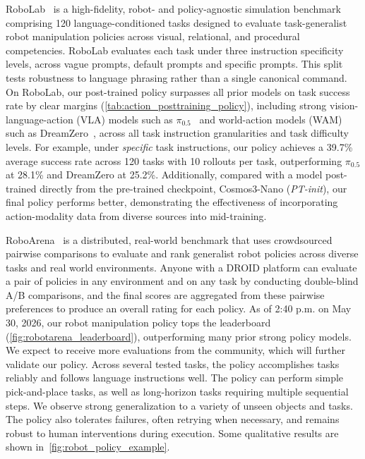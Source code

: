 RoboLab~\citep{yang2026robolab} is a high-fidelity, robot- and policy-agnostic simulation benchmark comprising 120 language-conditioned tasks designed to evaluate task-generalist robot manipulation policies across visual, relational, and procedural competencies.
RoboLab evaluates each task under three instruction specificity levels, across vague prompts, default prompts and specific prompts.
This split tests robustness to language phrasing rather than a single canonical command.
On RoboLab, our post-trained policy surpasses all prior models on task success rate by clear margins (\cref{tab:action_posttraining_policy}), including strong vision-language-action (VLA) models such as $\pi_{0.5}$~\citep{pi05} and world-action models (WAM) such as DreamZero~\citep{ye2026dreamzero},
across all task instruction granularities and task difficulty levels.
For example, under \textit{specific} task instructions, our policy achieves a 39.7\% average success rate across 120 tasks with 10 rollouts per task, outperforming $\pi_{0.5}$ at 28.1\% and DreamZero at 25.2\%.
Additionally, compared with a model post-trained directly from the pre-trained checkpoint, Cosmos3-Nano (\textit{PT-init}), our final policy performs better, demonstrating the effectiveness of incorporating action-modality data from diverse sources into mid-training.




RoboArena~\citep{atreya2025roboarena} is a distributed, real-world benchmark that uses crowdsourced pairwise comparisons to evaluate and rank generalist robot policies across diverse tasks and real world environments.
Anyone with a DROID platform can evaluate a pair of policies in any environment and on any task by conducting double-blind A/B comparisons, and the final scores are aggregated from these pairwise preferences to produce an overall rating for each policy.
As of 2:40 p.m. on May 30, 2026, our robot manipulation policy tops the leaderboard (\cref{fig:robotarena_leaderboard}), outperforming many prior strong policy models. 
We expect to receive more evaluations from the community, which will further validate our policy. 
Across several tested tasks, the policy accomplishes tasks reliably and follows language instructions well.
The policy can perform simple pick-and-place tasks, as well as long-horizon tasks requiring multiple sequential steps.
We observe strong generalization to a variety of unseen objects and tasks.
The policy also tolerates failures, often retrying when necessary, and remains robust to human interventions during execution.
Some qualitative results are shown in~\cref{fig:robot_policy_example}.


